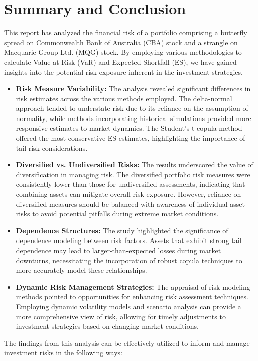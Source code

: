 \section{Summary and Conclusion}
This report has analyzed the financial risk of a portfolio comprising a butterfly spread on Commonwealth Bank of Australia (CBA) stock and a strangle on Macquarie Group Ltd. (MQG) stock. By employing various methodologies to calculate Value at Risk (VaR) and Expected Shortfall (ES), we have gained insights into the potential risk exposure inherent in the investment strategies.
\begin{itemize}
    \item \textbf{Risk Measure Variability:} The analysis revealed significant differences in risk estimates across the various methods employed. The delta-normal approach tended to understate risk due to its reliance on the assumption of normality, while methods incorporating historical simulations provided more responsive estimates to market dynamics. The Student’s t copula method offered the most conservative ES estimates, highlighting the importance of tail risk considerations.
    \item \textbf{Diversified vs. Undiversified Risks:} The results underscored the value of diversification in managing risk. The diversified portfolio risk measures were consistently lower than those for undiversified assessments, indicating that combining assets can mitigate overall risk exposure. However, reliance on diversified measures should be balanced with awareness of individual asset risks to avoid potential pitfalls during extreme market conditions.
    \item \textbf{Dependence Structures:} The study highlighted the significance of dependence modeling between risk factors. Assets that exhibit strong tail dependence may lead to larger-than-expected losses during market downturns, necessitating the incorporation of robust copula techniques to more accurately model these relationships.
    \item \textbf{Dynamic Risk Management Strategies:} The appraisal of risk modeling methods pointed to opportunities for enhancing risk assessment techniques. Employing dynamic volatility models and scenario analysis can provide a more comprehensive view of risk, allowing for timely adjustments to investment strategies based on changing market conditions.
\end{itemize}
The findings from this analysis can be effectively utilized to inform and manage investment risks in the following ways:
